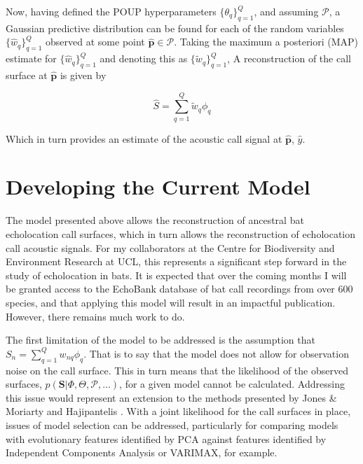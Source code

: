 \documentclass[]{article}
\begin{document}
Now, having defined the POUP hyperparameters \(\{\theta_q\}_{q = 1}^Q\), and assuming \(\mathcal{P}\), a Gaussian predictive distribution can be found for each of the random variables \(\{\hat{w}_q\}_{q = 1}^Q\) observed at some point \(\hat{\mathbf{p}} \in \mathcal{P}\). Taking the maximum a posteriori (MAP) estimate for \(\{\hat{w}_q\}_{q = 1}^Q\) and denoting this as \(\{\tilde{w}_q\}_{q = 1}^Q\), A reconstruction of the call surface at \(\hat{\mathbf{p}}\) is given by

\begin{equation}
\hat{S} = \sum_{q = 1}^{Q} \tilde{w}_q \phi_q
\label{eq:reconstruction}
\end{equation}

Which in turn provides an estimate of the acoustic call signal at \(\hat{\mathbf{p}}\), \(\hat{y}\).

\section{Developing the Current Model}

The model presented above allows the reconstruction of ancestral bat echolocation call surfaces, which in turn allows the reconstruction of echolocation call acoustic signals. For my collaborators at the Centre for Biodiversity and Environment Research at UCL, this represents a significant step forward in the study of echolocation in bats. It is expected that over the coming months I will be granted access to the EchoBank database of bat call recordings from over 600 species, and that applying this model will result in an impactful publication. However, there remains much work to do.

The first limitation of the model to be addressed is the assumption that \(S_n = \sum_{q = 1}^{Q} w_{nq} \phi_q\). That is to say that the model does not allow for observation noise on the call surface. This in turn means that the likelihood of the observed surfaces, \(p(\mathbf{S} | \Phi, \Theta, \mathcal{P}, \dots)\), for a given model cannot be calculated. Addressing this issue would represent an extension to the methods presented by Jones \& Moriarty \cite{jones2013evolutionary} and Hajipantelis \cite{hadjipantelis2013function}. With a joint likelihood for the call surfaces in place, issues of model selection can be addressed, particularly for comparing models with evolutionary features identified by PCA against features identified by Independent Components Analysis or VARIMAX, for example.
\end{document}
